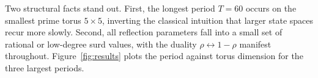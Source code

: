 Two structural facts stand out. First, the longest period $T=60$ occurs
on the smallest prime torus $5 \times 5$, inverting the classical
intuition that larger state spaces recur more slowly. Second, all
reflection parameters fall into a small set of rational or low-degree
surd values, with the duality $\rho \leftrightarrow 1-\rho$ manifest
throughout. Figure~\ref{fig:results} plots the period against torus
dimension for the three largest periods.
